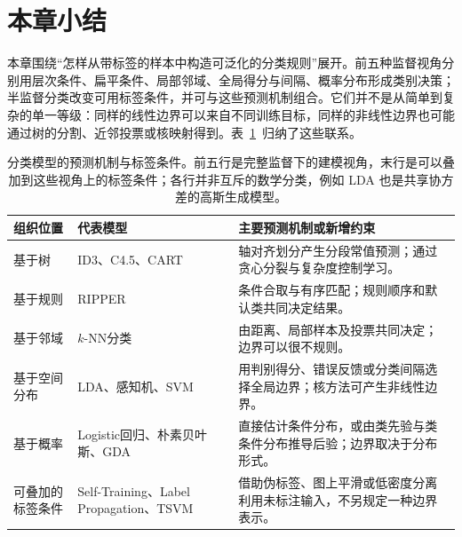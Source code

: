 






\section{本章小结}
\label{sec:classification-summary}

本章围绕“怎样从带标签的样本中构造可泛化的分类规则”展开。前五种监督视角分别用层次条件、扁平条件、局部邻域、全局得分与间隔、概率分布形成类别决策；半监督分类改变可用标签条件，并可与这些预测机制组合。它们并不是从简单到复杂的单一等级：同样的线性边界可以来自不同训练目标，同样的非线性边界也可能通过树的分割、近邻投票或核映射得到。表~\ref{tab:classification-overview}~归纳了这些联系。

\begin{table}[htbp]
  \centering
  \small
  \begin{tabularx}{\linewidth}{@{}>{\raggedright\arraybackslash}p{17mm}>{\raggedright\arraybackslash}p{30mm}>{\raggedright\arraybackslash}X@{}}
    \toprule
    组织位置 & 代表模型 & 主要预测机制或新增约束 \\
    \midrule
    基于树 & ID3、C4.5、CART & 轴对齐划分产生分段常值预测；通过贪心分裂与复杂度控制学习。 \\
    基于规则 & RIPPER & 条件合取与有序匹配；规则顺序和默认类共同决定结果。 \\
    基于邻域 & $k$-NN分类 & 由距离、局部样本及投票共同决定；边界可以很不规则。 \\
    基于空间分布 & LDA、感知机、SVM & 用判别得分、错误反馈或分类间隔选择全局边界；核方法可产生非线性边界。 \\
    基于概率 & Logistic回归、朴素贝叶斯、GDA & 直接估计条件分布，或由类先验与类条件分布推导后验；边界取决于分布形式。 \\
    可叠加的标签条件 & Self-Training、Label Propagation、TSVM & 借助伪标签、图上平滑或低密度分离利用未标注输入，不另规定一种边界表示。 \\
    \bottomrule
  \end{tabularx}
  \caption{分类模型的预测机制与标签条件。前五行是完整监督下的建模视角，末行是可以叠加到这些视角上的标签条件；各行并非互斥的数学分类，例如 LDA 也是共享协方差的高斯生成模型。}
  \label{tab:classification-overview}
\end{table}

